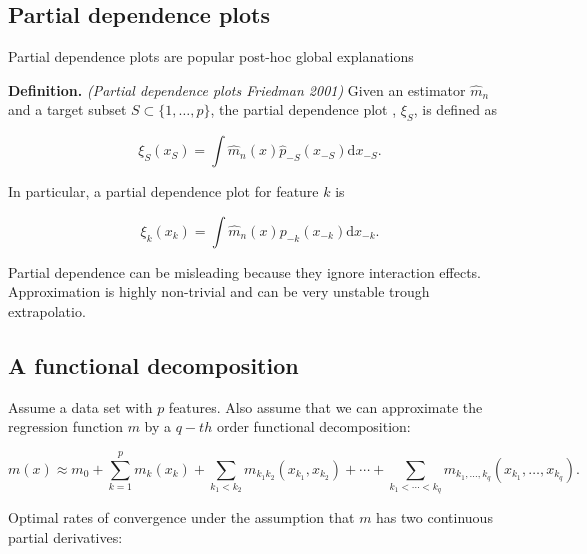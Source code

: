 \documentclass[
]{book}
\begin{document}
\hypertarget{partial-dependence-plots}{%
\subsection{Partial dependence plots}\label{partial-dependence-plots}}

Partial dependence plots are popular post-hoc global explanations

\textbf{Definition.} \emph{(Partial dependence plots Friedman 2001)} Given an estimator \(\hat m_n\) and a target subset \(S\subset \{1,\dots,p\}\), the partial dependence plot \citep{}, \(\xi_S\), is defined as

\[
\xi_S(x_S)= \int \hat m_n(x) \hat p_{-S}(x_{-S})\mathrm dx_{-S}.
\]

In particular, a partial dependence plot for feature \(k\) is

\[
\xi_k(x_k)= \int \hat m_n(x) p_{-k}(x_{-k})\mathrm dx_{-k}.
\]

Partial dependence can be misleading because they ignore interaction effects. Approximation is highly non-trivial and can be very unstable trough extrapolatio.

\hypertarget{a-functional-decomposition}{%
\subsection{A functional decomposition}\label{a-functional-decomposition}}

Assume a data set with \(p\) features. Also assume that we can approximate the regression function \(m\) by a \(q-th\) order functional decomposition:

\[m(x) \approx  m_0+\sum_{k=1}^p  m_k(x_{k}) + \sum_{k_1<k_2}  m_{k_1k_2}(x_{k_1},x_{k_2}) + \cdots +\sum_{k_1<\cdots <k_q}  m_{k_1,\dots,k_q} (x_{k_1},\dots,x_{k_q}).\]

Optimal rates of convergence under the assumption that \(m\) has
two continuous partial derivatives:
\end{document}

